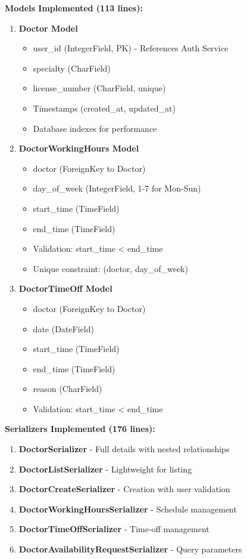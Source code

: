 \documentclass[12pt,a4paper]{article}
\begin{document}
\textbf{Models Implemented (113 lines):}
\begin{enumerate}
    \item \textbf{Doctor Model}
    \begin{itemize}
        \item user\_id (IntegerField, PK) - References Auth Service
        \item specialty (CharField)
        \item license\_number (CharField, unique)
        \item Timestamps (created\_at, updated\_at)
        \item Database indexes for performance
    \end{itemize}

    \item \textbf{DoctorWorkingHours Model}
    \begin{itemize}
        \item doctor (ForeignKey to Doctor)
        \item day\_of\_week (IntegerField, 1-7 for Mon-Sun)
        \item start\_time (TimeField)
        \item end\_time (TimeField)
        \item Validation: start\_time < end\_time
        \item Unique constraint: (doctor, day\_of\_week)
    \end{itemize}

    \item \textbf{DoctorTimeOff Model}
    \begin{itemize}
        \item doctor (ForeignKey to Doctor)
        \item date (DateField)
        \item start\_time (TimeField)
        \item end\_time (TimeField)
        \item reason (CharField)
        \item Validation: start\_time < end\_time
    \end{itemize}
\end{enumerate}

\textbf{Serializers Implemented (176 lines):}
\begin{enumerate}
    \item \textbf{DoctorSerializer} - Full details with nested relationships
    \item \textbf{DoctorListSerializer} - Lightweight for listing
    \item \textbf{DoctorCreateSerializer} - Creation with user validation
    \item \textbf{DoctorWorkingHoursSerializer} - Schedule management
    \item \textbf{DoctorTimeOffSerializer} - Time-off management
    \item \textbf{DoctorAvailabilityRequestSerializer} - Query parameters
\end{enumerate}
\end{document}
